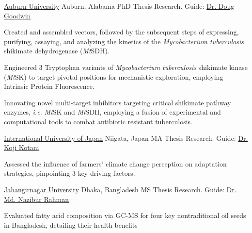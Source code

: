 \documentclass[10pt]{article}
\begin{document}
\spacedhrule{0.8ex}{0.0ex}

\headedsection
{\href{https://www.auburn.edu/}{Auburn University}}
{Auburn, Alabama}
{{PhD Thesis Research.} Guide: {\href{https://webhome.auburn.edu/~goodwdc/}{Dr. Doug Goodwin}}}
{}
{\vspace{-2.4ex}
	\begin{circlist}
        \item Created and assembled vectors, followed by the subsequent steps of expressing, purifying, assaying, and analyzing the kinetics of the \textit{Mycobacterium tuberculosis} shikimate dehydrogenase (\textit{Mt}SDH).
        \item Engineered 3 Tryptophan variants of \textit{Mycobacterium tuberculosis} shikimate kinase (\textit{Mt}SK) to target pivotal positions for mechanistic exploration, employing Intrinsic Protein Fluorescence. 
        \item Innovating novel multi-target inhibitors targeting critical shikimate pathway enzymes, \textit{i.e.} \textit{Mt}SK and \textit{Mt}SDH, employing a fusion of experimental and computational tools to combat antibiotic resistant tuberculosis.
	\end{circlist}
}

\headedsection
{\href{https://www.iuj.ac.jp/}{International University of Japan}}
{Niigata, Japan}
{{MA Thesis Research.} Guide: {\href{https://www.kochi-tech.ac.jp/profile/en/kotani-koji.html/}{Dr. Koji Kotani}}}
{}
{\vspace{-2.4ex}
	\begin{circlist}
		\item Assessed the influence of farmers' climate change perception on adaptation strategies, pinpointing 3 key driving factors.
	\end{circlist}
}

\headedsection
{\href{https://juniv.edu/}{Jahangirnagar University}}
{Dhaka, Bangladesh}
{{MS Thesis Research.} Guide: {\href{https://www.juniv.edu/teachers/nazibur}{Dr. Md. Nazibur Rahman}}}
{}
{\vspace{-2.4ex}
	\begin{circlist}
		\item Evaluated fatty acid composition via GC-MS for four key nontraditional oil seeds in Bangladesh, detailing their health benefits
	\end{circlist}
}
\newpage
\end{document}
